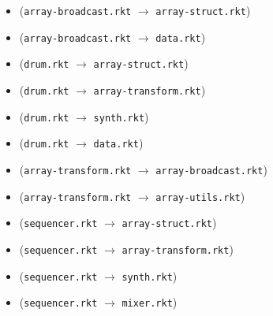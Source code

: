 \documentclass{article}
\newcommand{\mono}[1]{\texttt{#1}}
\begin{document}
\begin{itemize}
\begin{itemize}
  \item (\mono{array-broadcast.rkt} $\rightarrow$ \mono{array-struct.rkt})
  \item (\mono{array-broadcast.rkt} $\rightarrow$ \mono{data.rkt})
  \item (\mono{drum.rkt} $\rightarrow$ \mono{array-struct.rkt})
  \item (\mono{drum.rkt} $\rightarrow$ \mono{array-transform.rkt})
  \item (\mono{drum.rkt} $\rightarrow$ \mono{synth.rkt})
  \item (\mono{drum.rkt} $\rightarrow$ \mono{data.rkt})
  \item (\mono{array-transform.rkt} $\rightarrow$ \mono{array-broadcast.rkt})
  \item (\mono{array-transform.rkt} $\rightarrow$ \mono{array-utils.rkt})
  \item (\mono{sequencer.rkt} $\rightarrow$ \mono{array-struct.rkt})
  \item (\mono{sequencer.rkt} $\rightarrow$ \mono{array-transform.rkt})
  \item (\mono{sequencer.rkt} $\rightarrow$ \mono{synth.rkt})
  \item (\mono{sequencer.rkt} $\rightarrow$ \mono{mixer.rkt})
  \end{itemize}


\end{itemize}
\end{document}
